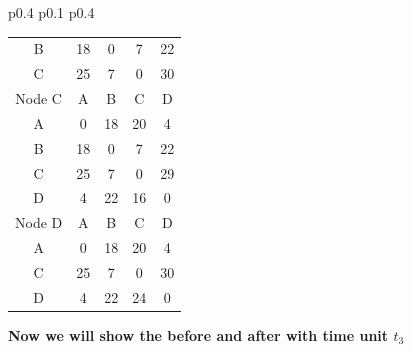 \documentclass{article}
\begin{document}
\begin{tabular}{p{0.4\linewidth} p{0.1\linewidth} p{0.4\linewidth}}
\begin{tabular}{c|c|c|c|c}
    B & 18 & 0 & 7 & 22 \\
    C & 25 & 7 & 0 & 30 \\
    \hline
    \hline
    Node C & A & B & C & D \\
    \hline
    A & 0 & 18 & 20 & 4 \\
    B & 18 & 0 & 7 & 22 \\
    C & 25 & 7 & 0 & \color{red}29 \\
    D & 4 & 22 & 16 & 0 \\
    \hline
    \hline
    Node D & A & B & C & D \\
    \hline
    A & 0 & 18 & 20 & 4 \\
    C & 25 & 7 & 0 & 30 \\
    D & 4 & 22 & \color{red}24 & 0 \\
    \hline
\end{tabular}
\end{tabular}

\textbf{Now we will show the before and after with time unit $t_3$}\\
\newline
\end{document}
